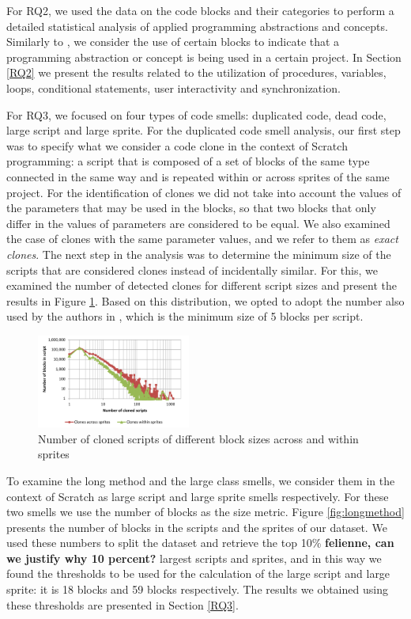 \documentclass{sig-alternate}
\newcommand{\todo}[1]{\textbf{#1}}
\begin{document}
For RQ2, we used the data on the code blocks and their categories to perform a detailed statistical analysis of applied programming abstractions and concepts. Similarly to \cite{Maloney_2008}, we consider the use of certain blocks to indicate that a programming abstraction or concept is being used in a certain project. In Section \ref{RQ2} we present the results related to the utilization of procedures, variables, loops, conditional statements, user interactivity and synchronization.

For RQ3, we focused on four types of code smells: duplicated code, dead code, large script and large sprite. For the duplicated code smell analysis, our first step was to specify what we consider a code clone in the context of Scratch programming: a script that is composed of a set of blocks of the same type connected in the same way and is repeated within or across sprites of the same project. For the identification of clones we did not take into account the values of the parameters that may be used in the blocks, so that two blocks that only differ in the values of parameters are considered to be equal. We also examined the case of clones with the same parameter values, and we refer to them as \textit{exact clones}. The next step in the analysis was to determine the minimum size of the scripts that are considered clones instead of incidentally similar. For this, we examined the number of detected clones for different script sizes and present the results in Figure \ref{fig:cloneslines}. Based on this distribution, we opted to adopt the number also used by the authors in \cite{moreno_automatic_2014}, which is the minimum size of 5 blocks per script.

\begin{figure}
	\centering
	\includegraphics[width=0.45\textwidth]{fig/charts/11cloneslines}
	\caption{Number of cloned scripts of different block sizes across and within sprites}
	\label{fig:cloneslines}
\end{figure}

To examine the long method and the large class smells, we consider them in the context of Scratch as large script and large sprite smells respectively. For these two smells we use the number of blocks as the size metric. Figure \ref{fig:longmethod} presents the number of blocks in the scripts and the sprites of our dataset. We used these numbers to split the dataset and retrieve the top 10\% \todo{felienne, can we justify why 10 percent?} largest scripts and sprites, and in this way we found the thresholds to be used for the calculation of the large script and large sprite: it is 18 blocks and 59 blocks respectively. The results we obtained using these thresholds are presented in Section \ref{RQ3}.
\end{document}
